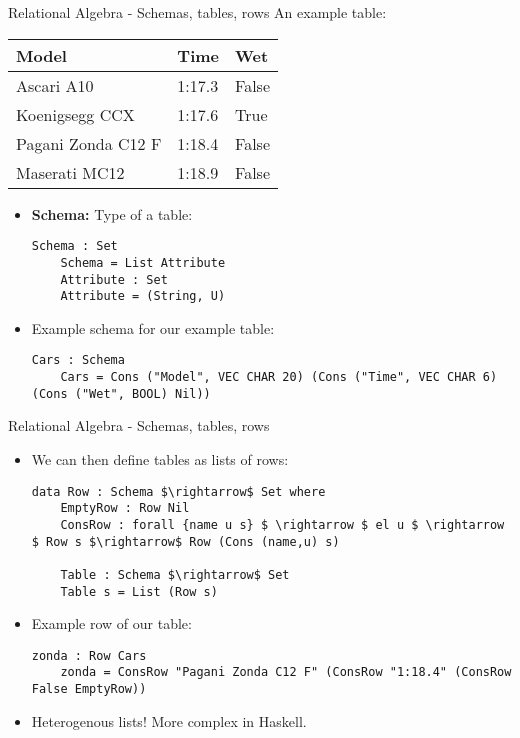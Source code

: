 \documentclass[10pt]{beamer}
\begin{document}
\begin{frame}[fragile]{Relational Algebra - Schemas, tables, rows}
An example table: \newline
    \begin{tabular}{ | l | l | l |}
    \hline
    Model & Time & Wet \\ \hline
    Ascari A10 & 1:17.3 & False \\ \hline
    Koenigsegg CCX & 1:17.6 & True\\ \hline
    Pagani Zonda C12 F & 1:18.4 & False \\ \hline
    Maserati MC12 & 1:18.9 & False \\ \hline
    \end{tabular}

\begin{itemize}
\item \textbf{Schema:} Type of a table:
\begin{lstlisting}[mathescape=true]
	Schema : Set
	Schema = List Attribute
	Attribute : Set
	Attribute = (String, U)
\end{lstlisting}
\item Example schema for our example table:
\begin{lstlisting}[mathescape=true]
	Cars : Schema
	Cars = Cons ("Model", VEC CHAR 20) (Cons ("Time", VEC CHAR 6) (Cons ("Wet", BOOL) Nil))
\end{lstlisting}
\end{itemize}

\end{frame}

\begin{frame}[fragile]{Relational Algebra - Schemas, tables, rows}

\begin{itemize}
\item We can then define tables as lists of rows:
\begin{lstlisting}[mathescape=true]
	data Row : Schema $\rightarrow$ Set where
	EmptyRow : Row Nil
	ConsRow : forall {name u s} $ \rightarrow $ el u $ \rightarrow $ Row s $\rightarrow$ Row (Cons (name,u) s)

	Table : Schema $\rightarrow$ Set
	Table s = List (Row s)
\end{lstlisting}
\item Example row of our table:
\begin{lstlisting}[mathescape=true]
	zonda : Row Cars
	zonda = ConsRow "Pagani Zonda C12 F" (ConsRow "1:18.4" (ConsRow False EmptyRow))
\end{lstlisting}
\item Heterogenous lists! More complex in Haskell.
\end{itemize}

\end{frame}
\end{document}
